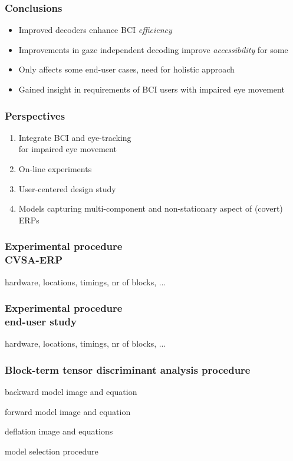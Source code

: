 \documentclass{kul-ulille-beamer}
\begin{document}
\begin{frame}
    \frametitle{Conclusions}
    \begin{changemargin}
    \begin{itemize}
      \item Improved decoders enhance BCI \emph{efficiency}
      \bigskip
      \item Improvements in gaze independent decoding improve
        \emph{accessibility} for some
      \bigskip
      \item Only affects some end-user cases, need for holistic approach
      \bigskip
      \item Gained insight in requirements of BCI users with impaired eye movement
    \end{itemize}
  \end{changemargin}
\end{frame}

\begin{frame}
  \frametitle{Perspectives}
  \begin{changemargin}
    \begin{enumerate}
     \item Integrate BCI and eye-tracking \\ for impaired eye movement
     \bigskip
     \item On-line experiments
     \bigskip
     \item User-centered design study
     \bigskip
     \item Models capturing multi-component and
       non-stationary aspect of (covert) ERPs
  \end{enumerate}
  \end{changemargin}
\end{frame}

%



\begin{frame}[noframenumbering]
  \frametitle{Experimental procedure \\ CVSA-ERP}
  hardware, locations, timings, nr of blocks, ...
\end{frame}
\begin{frame}
  \frametitle{Experimental procedure \\ end-user study}
  hardware, locations, timings, nr of blocks, ...
\end{frame}

\begin{frame}[noframenumbering]

  \frametitle{Block-term tensor discriminant analysis procedure}
  backward model image and equation

  forward model image and equation

  deflation image and equations

  model selection procedure
\end{frame}
\end{document}
